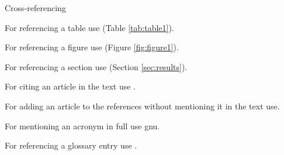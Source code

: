 
{\Huge Cross-referencing}

For referencing a table use (Table \ref{tab:table1}).

For referencing a figure use (Figure \ref{fig:figure1}).

For referencing a section use (Section \ref{sec:results}).

For citing an article in the text use \cite{won2015a}.
~\cite{won2015a}
\cite{won2015a}

For adding an article to the references without mentioning it in the text use\nocite{Anders2015a}.

For mentioning an acronym in full use \acrfull{gnu}.

For referencing a glossary entry use .


\clearpage